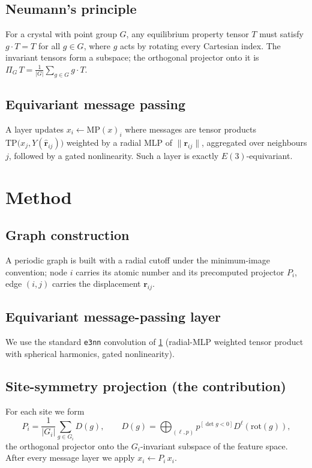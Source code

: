 \documentclass[11pt]{article}
\begin{document}
\subsection{Neumann's principle}
For a crystal with point group $G$, any equilibrium property tensor $T$ must
satisfy $g\cdot T = T$ for all $g\in G$, where $g$ acts by rotating every
Cartesian index. The invariant tensors form a subspace; the orthogonal projector
onto it is $\Pi_G\, T=\frac{1}{|G|}\sum_{g\in G} g\cdot T$.

\subsection{Equivariant message passing}
A layer updates $x_i \leftarrow \mathrm{MP}(x)_i$ where messages are tensor
products $\mathrm{TP}\big(x_j, Y(\hat{\bm r}_{ij})\big)$ weighted by a radial MLP
of $\lVert\bm r_{ij}\rVert$, aggregated over neighbours $j$, followed by a gated
nonlinearity. Such a layer is exactly $E(3)$-equivariant.

\section{Method}\label{sec:method}
\subsection{Graph construction}
A periodic graph is built with a radial cutoff under the minimum-image
convention; node $i$ carries its atomic number and its precomputed projector
$P_i$, edge $(i,j)$ carries the displacement $\bm r_{ij}$.

\subsection{Equivariant message-passing layer}
We use the standard \texttt{e3nn} convolution of \cref{sec:method} (radial-MLP
weighted tensor product with spherical harmonics, gated nonlinearity).

\subsection{Site-symmetry projection (the contribution)}
For each site we form
\begin{equation}
  P_i = \frac{1}{|G_i|}\sum_{g\in G_i} D(g),
  \qquad D(g)=\bigoplus_{(\ell,p)} p^{[\det g<0]} D^\ell(\mathrm{rot}(g)),
  \label{eq:proj}
\end{equation}
the orthogonal projector onto the $G_i$-invariant subspace of the feature space.
After every message layer we apply $x_i \leftarrow P_i\,x_i$.
\end{document}
